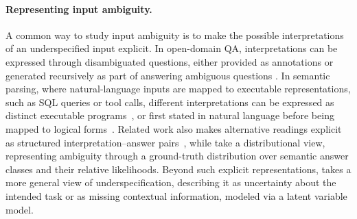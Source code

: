 \paragraph{Representing input ambiguity.}
 A common way to study input ambiguity is to make the possible interpretations of an underspecified input explicit.
In open-domain QA, interpretations can be expressed through disambiguated questions, either provided as annotations \citep{min-etal-2020-ambigqa} or generated recursively as part of answering ambiguous questions \citep{kim-etal-2023-tree}.
In semantic parsing, where natural-language inputs are mapped to executable representations, such as SQL queries or tool calls, different interpretations can be expressed as distinct executable programs~\citep{bhaskar-etal-2023-benchmarking,NEURIPS2024_a4c942a8}, or first stated in natural language before being mapped to logical forms~\citep{saparina-lapata-2025-disambiguate}. Related work also makes alternative readings explicit as structured interpretation--answer pairs~\citep{saparina2026reasoningintentambiguousrequests}, while \citet{tomov2026illusioncertaintyuncertaintyquantification} take a distributional view, representing ambiguity through a ground-truth distribution over semantic answer classes and their relative likelihoods.
Beyond such explicit representations, \citet{pmlr-v267-kirchhof25b} takes a more general view of underspecification, describing it as uncertainty about the intended task or as missing contextual information, modeled via a latent variable model.

